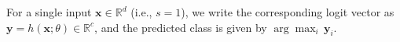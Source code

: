 \documentclass{article}
\theoremstyle{plain}
\newtheorem{model}[theorem]{Model}
\theoremstyle{definition}
\theoremstyle{remark}
\begin{document}
For a single input $\mathbf{x}\in\mathbb{R}^d$ (i.e., $s=1$), we write the corresponding logit vector as $\mathbf{y}=h(\mathbf{x};\theta)\in\mathbb{R}^c$, and the predicted class is given by $\arg\max_i\,\mathbf{y}_i$.


\end{document}
